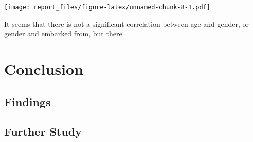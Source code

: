 \documentclass[12pt, oneside]{book}
\theoremstyle{definition}
\theoremstyle{definition}
\theoremstyle{definition}
\theoremstyle{remark}
\begin{document}
\texttt{[image: report\_files/figure-latex/unnamed-chunk-8-1.pdf]}

It seems that there is not a significant correlation between age and
gender, or gender and embarked from, but there

\hypertarget{conclusion}{%
\chapter{Conclusion}\label{conclusion}}

\hypertarget{findings}{%
\section{Findings}\label{findings}}

\hypertarget{further-study}{%
\section{Further Study}\label{further-study}}


\end{document}

